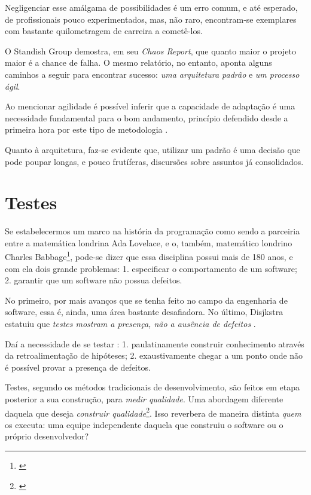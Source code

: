     Negligenciar esse amálgama de possibilidades é um erro comum, e até esperado, de profissionais pouco experimentados, mas, não raro, encontram-se exemplares com bastante quilometragem de carreira a cometê-los.

    O Standish Group demostra, em seu \emph{Chaos Report}\cite{ChaosReport2015}, que quanto maior o projeto maior é a chance de falha. O mesmo relatório, no entanto, aponta alguns caminhos a seguir para encontrar sucesso: \emph{uma arquitetura padrão} e \emph{um processo ágil}.

    Ao mencionar agilidade é possível inferir que a capacidade de adaptação é uma  necessidade fundamental para o bom andamento, princípio defendido desde a  primeira hora por este tipo de metodologia \cite{ManifestoAgil2001}.

    Quanto à  arquitetura, faz-se evidente que, utilizar um padrão é uma decisão que  pode poupar longas, e pouco frutíferas, discursões sobre assuntos já consolidados.

  \section{Testes}

    Se estabelecermos um marco na história da programação como sendo a parceiria entre a matemática londrina Ada Lovelace, e o, também, matemático londrino Charles Babbage\footnote{\cite{Huskey1980}}, pode-se dizer que essa disciplina possui mais de 180 anos, e com ela dois grande problemas: 1. especificar o comportamento de um software; 2. garantir que um software não possua defeitos.

    No primeiro, por mais avanços que se tenha feito no campo da engenharia de software, essa é, ainda, uma área bastante desafiadora. No último, Disjkstra estatuiu que \emph{testes mostram a presença, não a ausência de defeitos} \cite[pág. 16]{Nato1969}.

    Daí a necessidade de se testar \cite[pág. xxix-xxx]{Mezaros2007}: 1. paulatinamente construir conhecimento através da retroalimentação de hipóteses; 2. exaustivamente chegar a um ponto onde não é possível provar a presença de defeitos.

    Testes, segundo os métodos tradicionais de desenvolvimento, são feitos em etapa posterior a sua construção, para \emph{medir qualidade}. Uma abordagem diferente daquela que deseja \emph{construir qualidade}\footnote{ \cite[pág. 7]{FarcicGarcia2015}}. Isso reverbera de maneira distinta \emph{quem} os executa: uma equipe independente daquela que construiu o software ou o próprio desenvolvedor?

